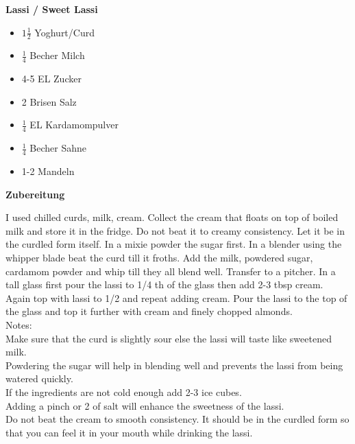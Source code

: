 \documentclass[a5paper, twoside]{report}
\begin{document}
\textbf{{\LARGE Lassi / Sweet Lassi}}%


\hrulefill
\vspace*{\fill}
\begin{multicols}{2}	


\begin{itemize}
\item $1\frac{1}{2}$ Yoghurt/Curd
\item $\frac{1}{4}$ Becher Milch
\item 4-5 EL Zucker
\item 2 Brisen Salz
\item $\frac{1}{4}$ EL Kardamompulver
 \item $\frac{1}{4}$ Becher Sahne
\item 1-2 Mandeln
\end{itemize}

\end{multicols}
\vfill
\newpage
\textbf{{\LARGE Zubereitung}}%

\hrulefill

\vspace*{\fill}
\begin{multicols}{2}

I used chilled curds, milk, cream.
Collect the cream that floats on top of boiled milk and store it in the fridge. Do not beat it to creamy consistency. Let it be in the curdled form itself.
In a mixie powder the sugar first. In a blender using the whipper blade beat the curd till it froths. Add the milk, powdered sugar, cardamom powder and whip till they all blend well.
Transfer to a pitcher. In a tall glass first pour the lassi to 1/4 th of the glass then add 2-3 tbsp cream. Again top with lassi to 1/2 and repeat adding cream. 
Pour the lassi to the top of the glass and top it further with cream and finely chopped almonds.\\

Notes:\\
Make sure that the curd is slightly sour else the lassi will taste like sweetened milk.\\
Powdering the sugar will help in blending well and prevents the lassi from being watered quickly.\\
If the ingredients are not cold enough add 2-3 ice cubes.\\
Adding a pinch or 2 of salt will enhance the sweetness of the lassi.\\
Do not beat the cream to smooth consistency. It should be in the curdled form so that you can feel it in your mouth while drinking the lassi.


\end{multicols}
\vfill
\end{document}
